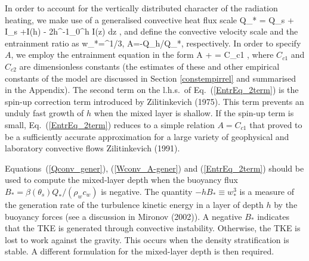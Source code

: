 In order to account for the vertically distributed character of 
the radiation heating,
we make use of a generalised convective heat flux scale 
%
\beq\label{Qconv_gener}
Q_* = Q_s + I_s +I(h) - 2h^{-1}\int_0^h I(z) dz ,
\eeq
%
and define the convective velocity scale and the entrainment ratio as 
%
\beq\label{Wconv_A-gener}
w_*=^{1/3}, 
\; \; \; \; \; \; \; \; \; \; 
A=-Q_h/Q_*, 
\eeq
%
respectively.
In order to specify $A$, we employ the entrainment equation in the form 
%
\beq\label{EntrEq_2term}
A +  = C_{c1} ,
\eeq
%
where $C_{c1}$ and $C_{c2}$ are dimensionless constants 
(the estimates of these and other empirical constants of the model
are discussed in Section \ref{constempirrel} and summarised in the Appendix).
The second term on the l.h.s.\ of Eq.~(\ref{EntrEq_2term})
is the spin-up correction term introduced by Zilitinkevich (1975)\nocite{zilitin1975}.
This term prevents an unduly fast growth of $h$
when the mixed layer is shallow.
If the spin-up term is small, 
Eq.~(\ref{EntrEq_2term}) reduces to a simple relation $A=C_{c1}$ 
that proved to be a sufficiently accurate approximation 
for a large variety of geophysical and laboratory convective flows 
Zilitinkevich (1991)\nocite{zilitin1991}.

Equations~(\ref{Qconv_gener}), (\ref{Wconv_A-gener}) and (\ref{EntrEq_2term})
should be used to compute the mixed-layer depth
when the buoyancy flux $B_*=\beta(\theta_s)Q_*/(\rho_w c_w)$ is negative. 
The quantity $-hB_*\equiv w_*^3$ is a measure of the generation rate of 
the turbulence kinetic energy in a layer of depth $h$ by the buoyancy forces 
(see a discussion in Mironov \etal (2002)).
A negative $B_*$ indicates that the TKE is generated through convective instability.
Otherwise, the TKE is lost to work against the gravity. 
This occurs when the density stratification is stable.
A different formulation for the mixed-layer depth is then required.


